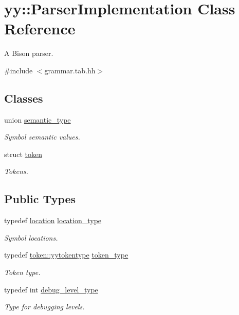 \hypertarget{classyy_1_1_parser_implementation}{
\section{yy::ParserImplementation Class Reference}
\label{classyy_1_1_parser_implementation}
}


A Bison parser.  




{\ttfamily \#include $<$grammar.tab.hh$>$}

\subsection*{Classes}
\begin{DoxyCompactItemize}
\item 
union \hyperlink{unionyy_1_1_parser_implementation_1_1semantic__type}{semantic\_\-type}
\begin{DoxyCompactList}\small\item\em Symbol semantic values. \end{DoxyCompactList}\item 
struct \hyperlink{structyy_1_1_parser_implementation_1_1token}{token}
\begin{DoxyCompactList}\small\item\em Tokens. \end{DoxyCompactList}\end{DoxyCompactItemize}
\subsection*{Public Types}
\begin{DoxyCompactItemize}
\item 
typedef \hyperlink{classyy_1_1location}{location} \hyperlink{classyy_1_1_parser_implementation_a4fa212b147b509e1f912727f1a1dd750}{location\_\-type}
\begin{DoxyCompactList}\small\item\em Symbol locations. \end{DoxyCompactList}\item 
typedef \hyperlink{structyy_1_1_parser_implementation_1_1token_aadf9ae7281b1272b27ee431a11ede892}{token::yytokentype} \hyperlink{classyy_1_1_parser_implementation_ae715e0b25dc35fa1c81dc46a7f5262b6}{token\_\-type}
\begin{DoxyCompactList}\small\item\em Token type. \end{DoxyCompactList}\item 
typedef int \hyperlink{classyy_1_1_parser_implementation_a3bc045d9c5422457dac380fd02718406}{debug\_\-level\_\-type}
\begin{DoxyCompactList}\small\item\em Type for debugging levels. \end{DoxyCompactList}\end{DoxyCompactItemize}

